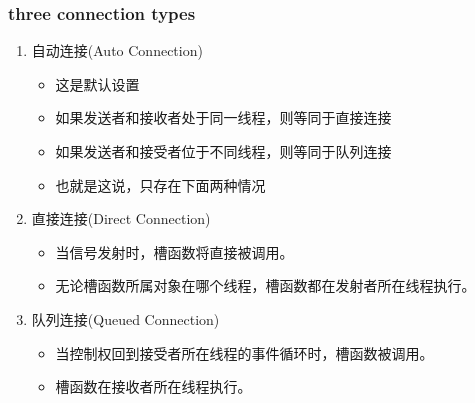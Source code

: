 \documentclass[9pt,b5paper]{article}
\begin{document}
\subsubsection{three connection types}
\label{sec-3-2-1}
\begin{enumerate}
\item 自动连接(Auto Connection)
\label{sec-3-2-1-1}
\begin{itemize}
\item 这是默认设置
\item 如果发送者和接收者处于同一线程，则等同于直接连接
\item 如果发送者和接受者位于不同线程，则等同于队列连接
\item 也就是这说，只存在下面两种情况
\end{itemize}
\item 直接连接(Direct Connection)
\label{sec-3-2-1-2}
\begin{itemize}
\item 当信号发射时，槽函数将直接被调用。
\item 无论槽函数所属对象在哪个线程，槽函数都在发射者所在线程执行。
\end{itemize}
\item 队列连接(Queued Connection)
\label{sec-3-2-1-3}
\begin{itemize}
\item 当控制权回到接受者所在线程的事件循环时，槽函数被调用。
\item 槽函数在接收者所在线程执行。
\end{itemize}
\end{enumerate}
\end{document}
